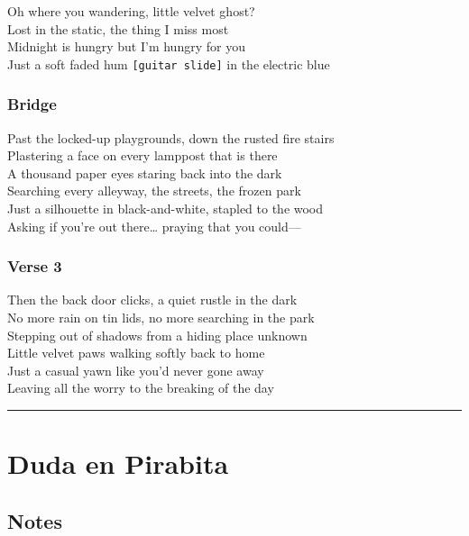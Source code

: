Oh where you wandering, little velvet ghost?\\
Lost in the static, the thing I miss most\\
Midnight is hungry but I'm hungry for you\\
Just a soft faded hum \texttt{{[}guitar\ slide{]}} in the electric blue

\subsubsection{Bridge}\label{bridge-11}

Past the locked-up playgrounds, down the rusted fire stairs\\
Plastering a face on every lamppost that is there\\
A thousand paper eyes staring back into the dark\\
Searching every alleyway, the streets, the frozen park\\
Just a silhouette in black-and-white, stapled to the wood\\
Asking if you're out there\ldots{} praying that you could---

\subsubsection{Verse 3}\label{verse-3-6}

Then the back door clicks, a quiet rustle in the dark\\
No more rain on tin lids, no more searching in the park\\
Stepping out of shadows from a hiding place unknown\\
Little velvet paws walking softly back to home\\
Just a casual yawn like you'd never gone away\\
Leaving all the worry to the breaking of the day

\begin{center}\rule{0.5\linewidth}{0.5pt}\end{center}

\section{Duda en Pirabita}\label{duda-en-pirabita}

\subsection{Notes}\label{notes-22}

